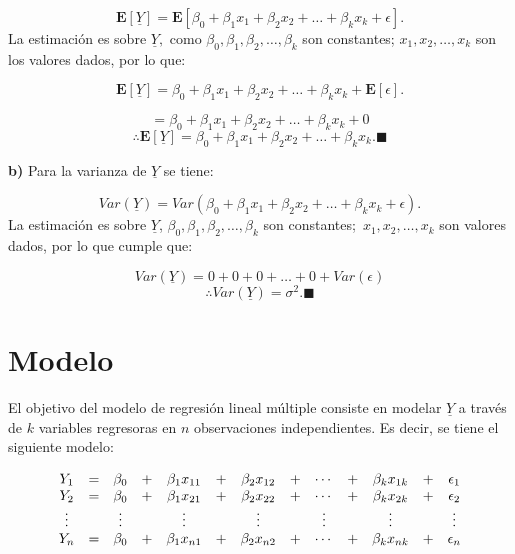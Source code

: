 \documentclass[
  a4paper,
  oneside,
  openany]{book}
\begin{document}
\[\mathbf{E}[\underline{Y}]=\mathbf{E}[\beta_{0}+\beta_{1}x_{1}+\beta_{2}x_{2}+ \ldots +\beta_{k}x_{k}+\epsilon].\]
La estimación es sobre \(\underline{Y},\)
como \(\beta_{0},\beta_{1},\beta_{2},\ldots,\beta_{k}\) son constantes; \(x_{1},x_{2}, \ldots,x_{k}\) son los valores dados, por lo que:

\[\mathbf{E}[\underline{Y}]=\beta_{0}+\beta_{1}x_{1}+\beta_{2}x_{2}+ \ldots +\beta_{k}x_{k}+\mathbf{E}[\epsilon].\]

\[=\beta_{0}+\beta_{1}x_{1}+\beta_{2}x_{2}+ \ldots +\beta_{k}x_{k}+0\]
\[\therefore \mathbf{E}[\underline{Y}]= \beta_{0}+\beta_{1}x_{1}+\beta_{2}x_{2}+ \ldots + \beta_{k}x_{k}. \blacksquare\]

\textbf{b)} Para la varianza de \(\underline{Y}\) se tiene:

\[Var(\underline{Y})=Var\left( \beta_{0}+\beta_{1}x_{1}+\beta_{2}x_{2}+ \ldots + \beta_{k}x_{k}+ \epsilon\right).\]
La estimación es sobre \(\underline{Y}\), \(\beta_{0},\beta_{1},\beta_{2},\ldots,\beta_{k}\) son constantes;~\(x_{1},x_{2},\ldots,x_{k}\) son valores dados, por lo que cumple que:

\[Var(\underline{Y})=0+0+0+\ldots+0+Var(\epsilon)\]
\[\therefore Var(\underline{Y})=\sigma^2.\blacksquare\]

\hypertarget{modelo}{%
\chapter{Modelo}\label{modelo}}

El objetivo del modelo de regresión lineal múltiple consiste en modelar \(\underline{Y}\) a través de \(k\) variables regresoras en \(n\) observaciones independientes. Es decir, se tiene el siguiente modelo:

\[
\begin{array}{ c c c c c c c c c c c c c }
Y_{1}  & = & \beta_{0} & + & \beta_{1}x_{11}& +& \beta_{2}x_{12} & +& \cdots & + & \beta_{k}x_{1k} & + & \epsilon_{1}  \\ 
Y_{2}  & = & \beta_{0} & + & \beta_{1}x_{21}& +& \beta_{2}x_{22} & +& \cdots & + & \beta_{k}x_{2k} & + & \epsilon_{2}  \\
\vdots  &  & \vdots &  & \vdots& & \vdots & & \vdots & & \vdots &  & \vdots  \\
Y_{n}  & = & \beta_{0} & + & \beta_{1}x_{n1}& +& \beta_{2}x_{n2} & +& \cdots & + & \beta_{k}x_{nk} & + & \epsilon_{n}  \\ 
\end{array}
\]
\end{document}
